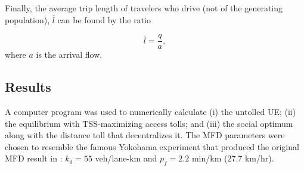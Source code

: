 \documentclass[preprint,authoryear]{elsarticle}
\begin{document}
Finally, the average trip length of travelers who drive (not of the generating population), $\bar{l}$ can be found by the ratio

\begin{equation}
	\bar{l} = \frac{q}{a},
\end{equation}
where $a$ is the arrival flow.

\subsection{Results}
\label{ssec:results}

A computer program was used to numerically calculate (i) the untolled UE; (ii) the equilibrium with TSS-maximizing access tolls; and (iii) the social optimum along with the distance toll that decentralizes it. The MFD parameters were chosen to resemble the famous Yokohama experiment that produced the original MFD result in \citet{Geroliminis2008}: $k_0 = 55$ veh/lane-km and $p_f=2.2$ min/km (27.7 km/hr).
\end{document}
